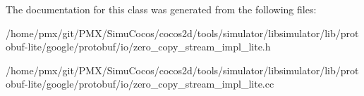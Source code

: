 The documentation for this class was generated from the following files\+:\begin{DoxyCompactItemize}
\item 
/home/pmx/git/\+P\+M\+X/\+Simu\+Cocos/cocos2d/tools/simulator/libsimulator/lib/protobuf-\/lite/google/protobuf/io/zero\+\_\+copy\+\_\+stream\+\_\+impl\+\_\+lite.\+h\item 
/home/pmx/git/\+P\+M\+X/\+Simu\+Cocos/cocos2d/tools/simulator/libsimulator/lib/protobuf-\/lite/google/protobuf/io/zero\+\_\+copy\+\_\+stream\+\_\+impl\+\_\+lite.\+cc\end{DoxyCompactItemize}
